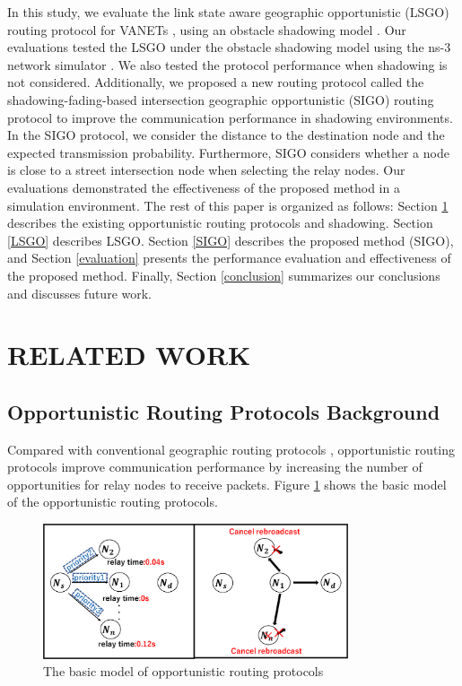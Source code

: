 \documentclass[conference]{IEEEtran}
\begin{document}
In this study, we evaluate the link state aware geographic opportunistic (LSGO)
routing protocol for VANETs \cite{18}, using an obstacle shadowing model \cite{20}. 
Our evaluations tested the LSGO under the obstacle shadowing model \cite{20} using the ns-3 network simulator \cite{19}. 
We also tested the protocol performance when shadowing is not considered.
Additionally, we proposed a new routing protocol called the shadowing-fading-based intersection geographic opportunistic (SIGO) routing protocol to improve the communication performance in shadowing environments.
In the SIGO protocol, we consider the distance to the destination node and the expected transmission probability. Furthermore, SIGO considers whether a node is close to a street intersection node  when selecting the relay nodes.
Our evaluations demonstrated the effectiveness of the proposed method in a simulation environment. 
The rest of this paper is organized as follows:
Section \ref{relatedSection} describes the existing opportunistic routing protocols and shadowing. 
Section \ref{LSGO} describes LSGO. 
Section \ref{SIGO} describes the proposed method (SIGO), and Section \ref{evaluation} presents the performance evaluation and effectiveness of the proposed method. Finally, Section \ref{conclusion} summarizes our conclusions and discusses future work.

\section{RELATED WORK}
\label{relatedSection}

\subsection{Opportunistic Routing Protocols Background}

Compared with conventional geographic routing protocols \cite{6}, opportunistic routing protocols improve communication performance by increasing the number of opportunities for relay nodes to receive packets. Figure \ref{fig:Basic} shows the basic model of the opportunistic routing protocols.

\begin{figure}[!ht]
\centering
\includegraphics[width=90mm]{figures/basic-opportunity2.eps}
\caption{The basic model of opportunistic routing protocols}
\label{fig:Basic}
\end{figure}
\end{document}
